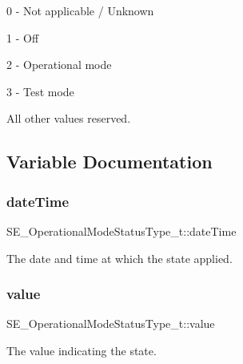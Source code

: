 0 -\/ Not applicable / Unknown

1 -\/ Off

2 -\/ Operational mode

3 -\/ Test mode

All other values reserved. 

\subsection{Variable Documentation}
\mbox{\label{group__OperationalModeStatusType_gab1ca6819ce73c80e1f1a370d20ff5247}} 
\subsubsection{\texorpdfstring{date\+Time}{dateTime}}
{\footnotesize\ttfamily S\+E\+\_\+\+Operational\+Mode\+Status\+Type\+\_\+t\+::date\+Time}

The date and time at which the state applied. \mbox{\label{group__OperationalModeStatusType_gade4c320e2f3a121c6918c2446220e81a}} 
\subsubsection{\texorpdfstring{value}{value}}
{\footnotesize\ttfamily S\+E\+\_\+\+Operational\+Mode\+Status\+Type\+\_\+t\+::value}

The value indicating the state. 